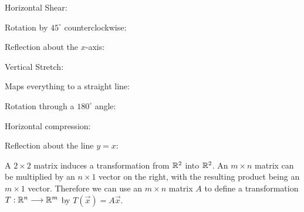 \documentclass{ximera}
\begin{document}
\begin{exploration}
Horizontal Shear: 

Rotation by $45^{\circ}$ counterclockwise: 

Reflection about the $x$-axis: 

Vertical Stretch: 

Maps everything to a straight line: 

Rotation through a $180^{\circ}$ angle: 

Horizontal compression: 

Reflection about the line $y=x$: 


\end{exploration}

A $2\times 2$ matrix induces a transformation from $\mathbb{R}^2$ into $\mathbb{R}^2$.  An $m\times n$ matrix can be multiplied by an $n\times 1$ vector on the right, with the resulting product being an $m\times 1$ vector.  Therefore we can use an $m\times n$ matrix $A$ to define a transformation $T:\mathbb{R}^n\longrightarrow \mathbb{R}^m$ by $T(\vec{x})=A\vec{x}$.
\end{document}
